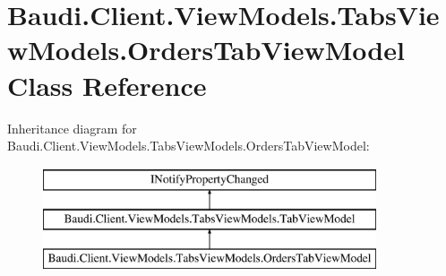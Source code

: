 \hypertarget{class_baudi_1_1_client_1_1_view_models_1_1_tabs_view_models_1_1_orders_tab_view_model}{}\section{Baudi.\+Client.\+View\+Models.\+Tabs\+View\+Models.\+Orders\+Tab\+View\+Model Class Reference}
\label{class_baudi_1_1_client_1_1_view_models_1_1_tabs_view_models_1_1_orders_tab_view_model}
Inheritance diagram for Baudi.\+Client.\+View\+Models.\+Tabs\+View\+Models.\+Orders\+Tab\+View\+Model\+:\begin{figure}[H]
\begin{center}
\leavevmode
\includegraphics[height=3.000000cm]{class_baudi_1_1_client_1_1_view_models_1_1_tabs_view_models_1_1_orders_tab_view_model}
\end{center}
\end{figure}
